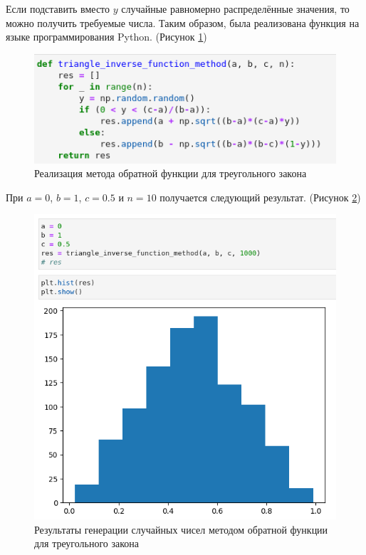 \documentclass[14pt,fleqn]{extarticle}
\begin{document}
	Если подставить вместо $y$ случайные равномерно распределённые значения, то можно получить требуемые числа.
	\newpage
	Таким образом, была реализована функция на языке программирования Python. (Рисунок \ref{fig:triangle_inverse_function_method_code})
	\begin{figure}[h]
		\centering \includegraphics[scale=0.7]{triangle_inverse_function_method_code}
		\caption{Реализация метода обратной функции для треугольного закона}
		\label{fig:triangle_inverse_function_method_code}
	\end{figure}

	При $a = 0$, $b = 1$, $c = 0.5$ и $n = 10$ получается следующий результат. (Рисунок \ref{fig:triangle_inverse_function_method_result})
	\begin{figure}[h]
		\centering \includegraphics[scale=0.5]{triangle_inverse_function_method_result}
		\caption{Результаты генерации случайных чисел методом обратной функции для треугольного закона}
		\label{fig:triangle_inverse_function_method_result}
	\end{figure}
	
\end{document}
